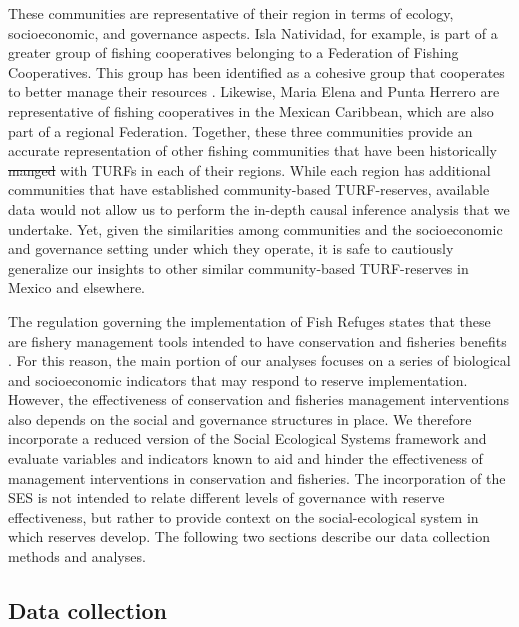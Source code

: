 \documentclass[10pt,letterpaper]{article}
\providecommand{\DIFaddtex}[1]{{\protect\color{blue}\uwave{#1}}} %
\providecommand{\DIFdeltex}[1]{{\protect\color{red}\sout{#1}}}                      %
\providecommand{\DIFaddbegin}{} %
\providecommand{\DIFaddend}{} %
\providecommand{\DIFdelbegin}{} %
\providecommand{\DIFdelend}{} %
\providecommand{\DIFadd}[1]{\texorpdfstring{\DIFaddtex{#1}}{#1}} %
\providecommand{\DIFdel}[1]{\texorpdfstring{\DIFdeltex{#1}}{}} %
\newcommand{\DIFscaledelfig}{0.5}
\newlength{\DIFdelgraphicswidth} %
\newlength{\DIFdelgraphicsheight} %
\newcommand{\DIFaddincludegraphics}[2][]{{\color{blue}\fbox{\DIFOincludegraphics[#1]{#2}}}} %
\newcommand{\DIFdelincludegraphics}[2][]{%
\sbox{\DIFdelgraphicsbox}{\DIFOincludegraphics[#1]{#2}}%
\settoboxwidth{\DIFdelgraphicswidth}{\DIFdelgraphicsbox} %
\settoboxtotalheight{\DIFdelgraphicsheight}{\DIFdelgraphicsbox} %
\scalebox{\DIFscaledelfig}{%
\parbox[b]{\DIFdelgraphicswidth}{\usebox{\DIFdelgraphicsbox}\\[-\baselineskip] \rule{\DIFdelgraphicswidth}{0em}}\llap{\resizebox{\DIFdelgraphicswidth}{\DIFdelgraphicsheight}{%
\setlength{\unitlength}{\DIFdelgraphicswidth}%
\begin{picture}(1,1)%
\thicklines\linethickness{2pt} %
{\color[rgb]{1,0,0}\put(0,0){\framebox(1,1){}}}%
{\color[rgb]{1,0,0}\put(0,0){\line( 1,1){1}}}%
{\color[rgb]{1,0,0}\put(0,1){\line(1,-1){1}}}%
\end{picture}%
}\hspace*{3pt}}} %
} %
\DeclareRobustCommand{\DIFaddbegin}{\DIFOaddbegin \let\includegraphics\DIFaddincludegraphics} %
\DeclareRobustCommand{\DIFaddend}{\DIFOaddend \let\includegraphics\DIFOincludegraphics} %
\DeclareRobustCommand{\DIFdelbegin}{\DIFOdelbegin \let\includegraphics\DIFdelincludegraphics} %
\DeclareRobustCommand{\DIFdelend}{\DIFOaddend \let\includegraphics\DIFOincludegraphics} %
\begin{document}
These communities are representative of their region in terms of ecology, socioeconomic, and governance aspects. Isla Natividad, for example, is part of a greater group of fishing cooperatives belonging to a Federation of Fishing Cooperatives. This group has been identified as a cohesive group that cooperates to better manage their resources \cite{mccay_2014,mccay_2017,acevesbueno_2017}. Likewise, Maria Elena and Punta Herrero are representative of fishing cooperatives in the Mexican Caribbean, which are also part of a regional Federation. Together, these three communities provide an accurate representation of other fishing communities that have been historically \DIFdelbegin \DIFdel{manged }\DIFdelend \DIFaddbegin \DIFadd{managed }\DIFaddend with TURFs in each of their regions. While each region has additional communities that have established community-based TURF-reserves, available data would not allow us to perform the in-depth causal inference analysis that we undertake. Yet, given the similarities among communities and the socioeconomic and governance setting under which they operate, it is safe to cautiously generalize our insights to other similar community-based TURF-reserves in Mexico and elsewhere.

The regulation governing the implementation of Fish Refuges states that these are fishery management tools intended to have conservation and fisheries benefits \cite{nom}. For this reason, the main portion of our analyses focuses on a series of biological and socioeconomic indicators that may respond to reserve implementation. However, the effectiveness of conservation and fisheries management interventions also depends on the social and governance structures in place. We therefore incorporate a reduced version of the Social Ecological Systems framework \cite{ostrom_2009} and evaluate variables and indicators known to aid and hinder the effectiveness of management interventions in conservation and fisheries. The incorporation of the SES is not intended to relate different levels of governance with reserve effectiveness, but rather to provide context on the social-ecological system in which reserves develop. The following two sections describe our data collection methods and analyses.

\subsection*{Data collection}
\end{document}
